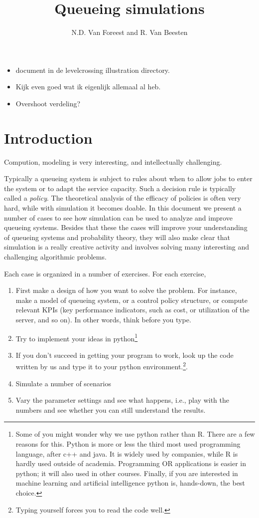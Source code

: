 \documentclass{scrartcl}
\title{Queueing simulations}
\author{N.D. Van Foreest and R. Van Beesten}
\begin{document}
\maketitle

\begin{itemize}
\item document in de levelcrossing illustration directory. 
\item Kijk even goed wat ik eigenlijk allemaal al heb.
\item Overshoot verdeling? 
\end{itemize}

\section{Introduction}

Compution, modeling is very interesting, and intellectually challenging. 


Typically a queueing system is subject to rules about when to allow jobs to enter the system or to adapt the service capacity. Such a decision rule is typically called a \emph{policy}.  The theoretical analysis of the efficacy of policies is often very hard, while with simulation it becomes doable.  In this document we present a number of cases to see how simulation can be used to analyze and improve queueing systems. Besides that these the cases will improve your understanding of queueing systems and probability theory, they will also make clear  that simulation is a really creative activity and involves solving many interesting and challenging  algorithmic problems.  


Each case is organized in a number of exercises. For each exercise,
\begin{enumerate}
\item First make a design of how you want to solve the problem. For instance, make a model of  queueing system, or a control policy structure, or compute relevant KPIs (key performance indicators, such as cost, or utilization of the server, and so on). In other words, think before you type. 
\item Try to implement your ideas in python\footnote{Some of you might wonder why we use python rather than R. There are a few reasons for this. Python is more or less the third most used programming language, after c++ and java. It is widely used by companies, while R is hardly  used outside of academia. Programming OR applications is easier in python; it will also used in other courses. Finally, if you are interested in machine learning and artificial intelligence python is, hands-down, the best choice.}
  \item If you don't succeed in getting your program to work,  look up the code written by us and type it to your python environment.\footnote{Typing yourself forces you to read the code well.}.
  \item Simulate a number of scenarios
  \item Vary the parameter settings and see what happens, i.e., play with the numbers and see whether you can still understand the results. 
\end{enumerate}
\end{document}
